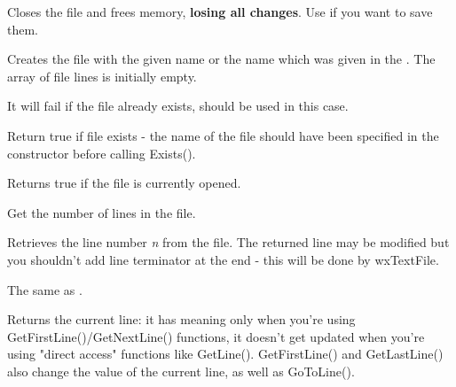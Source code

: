 Closes the file and frees memory, {\bf losing all changes}. Use  
if you want to save them.

\label{wxtextfilecreate}



Creates the file with the given name or the name which was given in the
. The array of file lines is initially
empty.

It will fail if the file already exists,  should
be used in this case.

\label{wxtextfileexists}


Return true if file exists - the name of the file should have been specified
in the constructor before calling Exists().

\label{wxtextfileisopened}


Returns true if the file is currently opened.

\label{wxtextfilegetlinecount}


Get the number of lines in the file.

\label{wxtextfilegetline}


Retrieves the line number {\it n} from the file. The returned line may be
modified but you shouldn't add line terminator at the end - this will be done
by wxTextFile.

\label{wxtextfileoperatorarray}


The same as .

\label{wxtextfilegetcurrentline}


Returns the current line: it has meaning only when you're using
GetFirstLine()/GetNextLine() functions, it doesn't get updated when
you're using "direct access" functions like GetLine(). GetFirstLine() and
GetLastLine() also change the value of the current line, as well as
GoToLine().


